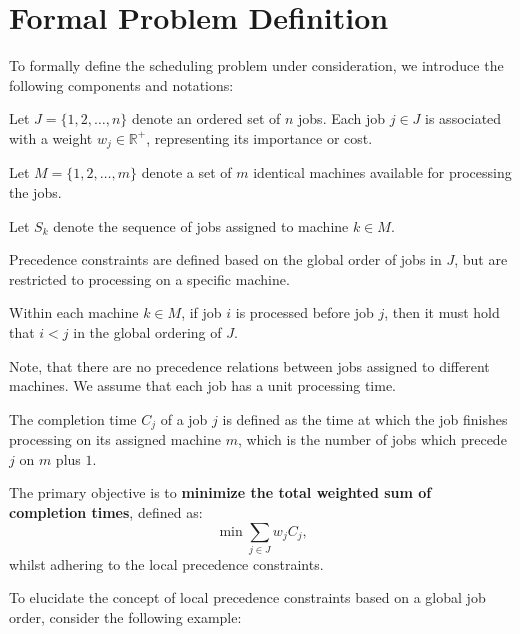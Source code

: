 \section{Formal Problem Definition}

To formally define the scheduling problem under consideration, we introduce the following components and notations:

\begin{definition}[Jobs]
    Let $J = \{1, 2, \dots, n\}$ denote an ordered set of $n$ jobs. Each job $j \in J$ is associated with a weight $w_j \in \mathbb{R}^+$, representing its importance or cost.
\end{definition}

\begin{definition}[Machines]
    Let $M = \{1, 2, \dots, m\}$ denote a set of $m$ identical machines available for processing the jobs.

    Let $S_k$ denote the sequence of jobs assigned to machine $k \in M$.
\end{definition}

Precedence constraints are defined based on the global order of jobs in $J$, but are restricted to processing on a specific machine.
\begin{definition}
    Within each machine $k \in M$, if job $i$ is processed before job $j$, then it must hold that $i < j$ in the global ordering of $J$.
\end{definition}
Note, that there are no precedence relations between jobs assigned to different machines. We assume that each job has a unit processing time.
\begin{definition}
    The completion time $C_j$ of a job $j$ is defined as the time at which the job finishes processing on its assigned machine $m$, which is the number of jobs which precede $j$ on $m$ plus $1$.
\end{definition}

\begin{definition}
    The primary objective is to \textbf{minimize the total weighted sum of completion times}, defined as:
    \[
        \min \sum_{j \in J} w_j C_j\text{,}
    \]
    whilst adhering to the local precedence constraints.
\end{definition}

To elucidate the concept of local precedence constraints based on a global job order, consider the following example:

